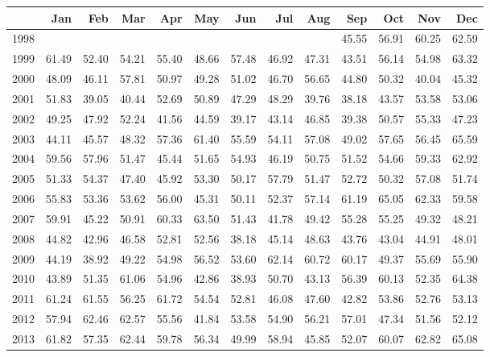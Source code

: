 \begin{longtable}{rrrrrrrrrrrrr}
  \hline
 & Jan & Feb & Mar & Apr & May & Jun & Jul & Aug & Sep & Oct & Nov & Dec \\ 
  \hline
1998 &  &  &  &  &  &  &  &  & 45.55 & 56.91 & 60.25 & 62.59 \\ 
  1999 & 61.49 & 52.40 & 54.21 & 55.40 & 48.66 & 57.48 & 46.92 & 47.31 & 43.51 & 56.14 & 54.98 & 63.32 \\ 
  2000 & 48.09 & 46.11 & 57.81 & 50.97 & 49.28 & 51.02 & 46.70 & 56.65 & 44.80 & 50.32 & 40.04 & 45.32 \\ 
  2001 & 51.83 & 39.05 & 40.44 & 52.69 & 50.89 & 47.29 & 48.29 & 39.76 & 38.18 & 43.57 & 53.58 & 53.06 \\ 
  2002 & 49.25 & 47.92 & 52.24 & 41.56 & 44.59 & 39.17 & 43.14 & 46.85 & 39.38 & 50.57 & 55.33 & 47.23 \\ 
  2003 & 44.11 & 45.57 & 48.32 & 57.36 & 61.40 & 55.59 & 54.11 & 57.08 & 49.02 & 57.65 & 56.45 & 65.59 \\ 
  2004 & 59.56 & 57.96 & 51.47 & 45.44 & 51.65 & 54.93 & 46.19 & 50.75 & 51.52 & 54.66 & 59.33 & 62.92 \\ 
  2005 & 51.33 & 54.37 & 47.40 & 45.92 & 53.30 & 50.17 & 57.79 & 51.47 & 52.72 & 50.32 & 57.08 & 51.74 \\ 
  2006 & 55.83 & 53.36 & 53.62 & 56.00 & 45.31 & 50.11 & 52.37 & 57.14 & 61.19 & 65.05 & 62.33 & 59.58 \\ 
  2007 & 59.91 & 45.22 & 50.91 & 60.33 & 63.50 & 51.43 & 41.78 & 49.42 & 55.28 & 55.25 & 49.32 & 48.21 \\ 
  2008 & 44.82 & 42.96 & 46.58 & 52.81 & 52.56 & 38.18 & 45.14 & 48.63 & 43.76 & 43.04 & 44.91 & 48.01 \\ 
  2009 & 44.19 & 38.92 & 49.22 & 54.98 & 56.52 & 53.60 & 62.14 & 60.72 & 60.17 & 49.37 & 55.69 & 55.90 \\ 
  2010 & 43.89 & 51.35 & 61.06 & 54.96 & 42.86 & 38.93 & 50.70 & 43.13 & 56.39 & 60.13 & 52.35 & 64.38 \\ 
  2011 & 61.24 & 61.55 & 56.25 & 61.72 & 54.54 & 52.81 & 46.08 & 47.60 & 42.82 & 53.86 & 52.76 & 53.13 \\ 
  2012 & 57.94 & 62.46 & 62.57 & 55.56 & 41.84 & 53.58 & 54.90 & 56.21 & 57.01 & 47.34 & 51.56 & 52.12 \\ 
  2013 & 61.82 & 57.35 & 62.44 & 59.78 & 56.34 & 49.99 & 58.94 & 45.85 & 52.07 & 60.07 & 62.82 & 65.08 \\ 

\end{longtable}
